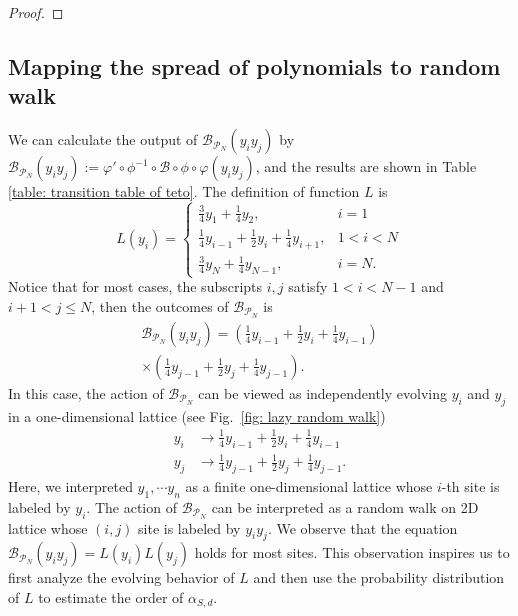 \documentclass[showpacs,twocolumn,aps,prx,long bibliography,superscriptaddress,notitlepage]{revtex4-1}
\begin{document}
\begin{proof}
\end{proof}



\subsection{Mapping the spread of polynomials to random walk}
\label{sec: mapping the action of tensors to random walk}

\newcommand{\teto}{\mathcal{B}_{\mathcal{P}_N}}
We can calculate the output of $\teto (y_iy_j)$ by $\teto(y_i y_j) := \varphi' \circ \phi^{-1} \circ \mathcal{B}\circ \phi \circ \varphi(y_i y_j)$, and the results are shown in Table \ref{table: transition table of teto}. The definition of function $L$ is
\begin{equation}
\label{eq: lazy random walk L}
L\left(y_i\right)=
\begin{cases}
\frac{3}{4} y_1+\frac{1}{4} y_2, &i=1 \\
\frac{1}{4} y_{i-1}+\frac{1}{2} y_i+\frac{1}{4} y_{i+1}, &1<i<N \\
\frac{3}{4} y_N+\frac{1}{4} y_{N-1}, &i=N. 
\end{cases}
\end{equation}
Notice that for most cases, the subscripts $i,j$ satisfy $1<i<N-1$ and $i+1<j\leq N$, then the outcomes of $\teto$ is
\begin{equation}
    \label{eq: zz anonymous 5}
    \begin{aligned}
        \teto (y_iy_j) = \left(\frac{1}{4} y_{i-1} + \frac{1}{2}y_i + \frac{1}{4} y_{i-1}\right) \\
        \times \left( \frac{1}{4} y_{j-1} + \frac{1}{2}y_j + \frac{1}{4} y_{j-1} \right).
    \end{aligned}
\end{equation}
In this case, the action of $\teto$ can be viewed as independently evolving $y_i$ and $y_j$ in a one-dimensional lattice (see Fig.~\ref{fig: lazy random walk})
\begin{equation}
\label{eq: separate evolution}
    \begin{aligned}
        y_i &\to \frac{1}{4} y_{i-1} + \frac{1}{2}y_i + \frac{1}{4} y_{i-1}\\
    y_j &\to \frac{1}{4} y_{j-1} + \frac{1}{2}y_j + \frac{1}{4} y_{j-1}.
    \end{aligned}
\end{equation}
Here, we interpreted $y_1, \cdots y_n$ as a finite one-dimensional lattice whose $i$-th site is labeled by $y_i$. The action of $\mathcal{B}_{\mathcal{P}_N}$ can be interpreted as a random walk on 2D lattice whose $(i,j)$ site is labeled by $y_iy_j$. 
We observe that the equation $\mathcal{B}_{\mathcal{P}_N}(y_iy_j) = L(y_i)L(y_j)$ holds for most sites. This observation inspires us to first analyze the evolving behavior of $L$ and then use the probability distribution of $L$ to estimate the order of $\alpha_{S,d}$.
\end{document}
